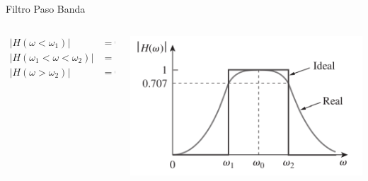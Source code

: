 \documentclass[xcolor={usenames,svgnames,dvipsnames}]{beamer}
\begin{document}
\begin{frame}[label={sec:orgf1ceb69}]{Filtro Paso Banda}
\begin{columns}
\begin{column}{0.3\columnwidth}
\begin{align*}
  |H(\omega < \omega_1)| &= 0\\
  |H(\omega_1 < \omega < \omega_2)| &= 1\\
  |H(\omega > \omega_2)| &= 0
\end{align*}
\end{column}

\begin{column}{0.7\columnwidth}
\begin{center}
\includegraphics[width=.9\linewidth]{../figs/Filtro_PasoBanda.pdf}
\end{center}
\end{column}
\end{columns}
\end{frame}
\end{document}
